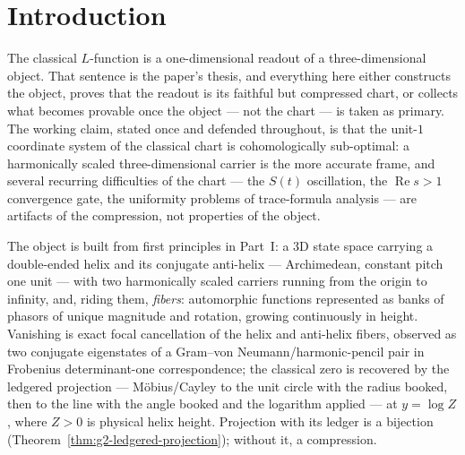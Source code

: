 \documentclass[11pt]{article}
\theoremstyle{definition}
\renewcommand{\Re}{\operatorname{Re}}
\begin{document}
\begin{center}
\small
{}
\end{center}

\tableofcontents











\section*{Introduction}

The classical $L$-function is a one-dimensional readout of a three-dimensional
object. That sentence is the paper's thesis, and everything here either
constructs the object, proves that the readout is its faithful but compressed
chart, or collects what becomes provable once the object --- not the chart ---
is taken as primary. The working claim, stated once and defended throughout,
is that the unit-$1$ coordinate system of the classical chart is
cohomologically sub-optimal: a harmonically scaled three-dimensional carrier
is the more accurate frame, and several recurring difficulties of the chart
--- the $S(t)$ oscillation, the $\Re s>1$ convergence gate, the uniformity
problems of trace-formula analysis --- are artifacts of the compression, not
properties of the object.

The object is built from first principles in Part~I: a 3D state space
carrying a double-ended helix and its conjugate anti-helix --- Archimedean,
constant pitch one unit --- with two harmonically scaled carriers running from
the origin to infinity, and, riding them, \emph{fibers}: automorphic functions
represented as banks of phasors of unique magnitude and rotation, growing
continuously in height. Vanishing is exact focal cancellation of the helix and
anti-helix fibers, observed as two conjugate eigenstates of a Gram--von
Neumann/harmonic-pencil pair in Frobenius determinant-one correspondence; the
classical zero is recovered by the ledgered projection --- M\"obius/Cayley to
the unit circle with the radius booked, then to the line with the angle booked
and the logarithm applied --- at $y=\log Z$, where $Z>0$ is physical helix
height. Projection with its ledger is a
bijection (Theorem~\ref{thm:g2-ledgered-projection}); without it, a
compression.
\end{document}
